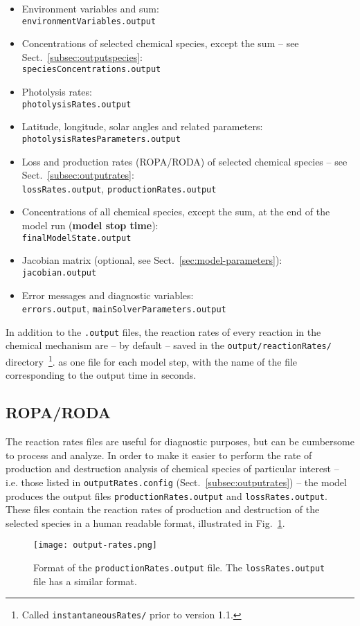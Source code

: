 \begin{itemize}
\item Environment variables and  sum:\\
  \texttt{environmentVariables.output}
\item Concentrations of selected chemical species, except the 
  sum -- see Sect.~\ref{subsec:outputspecies}:\\
  \texttt{speciesConcentrations.output}
\item Photolysis rates:\\
  \texttt{photolysisRates.output}
\item Latitude, longitude, solar angles and related parameters:\\
  \texttt{photolysisRatesParameters.output}
\item Loss and production rates (ROPA/RODA) of selected chemical
  species -- see Sect.~\ref{subsec:outputrates}:\\
  \texttt{lossRates.output}, \texttt{productionRates.output}
\item Concentrations of all chemical species, except the  sum,
  at the end of the model run (\textbf{model stop time}):\\
  \texttt{finalModelState.output}
\item Jacobian matrix (optional, see Sect.~\ref{sec:model-parameters}):\\
  \texttt{jacobian.output}
\item Error messages and diagnostic variables:\\
  \texttt{errors.output}, \texttt{mainSolverParameters.output}
\end{itemize}

In addition to the \texttt{.output} files, the reaction rates of every
reaction in the chemical mechanism are -- by default -- saved in the
\texttt{output/reactionRates/} directory~\footnote{Called
  \texttt{instantaneousRates/} prior to version 1.1.}. as one file for
each model step, with the name of the file corresponding to the output
time in seconds.

\subsection{ROPA/RODA} \label{subsec:ropa-roda}

The reaction rates files are useful for diagnostic purposes, but can
be cumbersome to process and analyze. In order to make it easier to
perform the rate of production and destruction analysis of chemical
species of particular interest -- i.e. those listed in
\texttt{outputRates.config} (Sect.~\ref{subsec:outputrates}) -- the
model produces the output files \texttt{productionRates.output} and
\texttt{lossRates.output}. These files contain the reaction rates of
production and destruction of the selected species in a human readable
format, illustrated in Fig.~\ref{fig:ropa}.

\begin{figure}[htb]
  \centering
  \texttt{[image: output-rates.png]}
  \caption{Format of the \texttt{productionRates.output} file. The
    \texttt{lossRates.output} file has a similar format.}
  \label{fig:ropa}
\end{figure}
